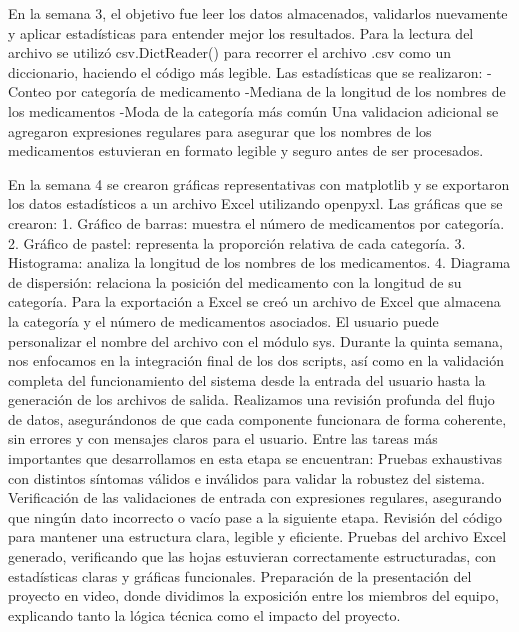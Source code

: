 \documentclass[11pt,letterpaper]{article}
\begin{document}
En la semana 3, el objetivo fue leer los datos almacenados, validarlos nuevamente y aplicar estadísticas para entender mejor los resultados. Para la lectura del archivo se utilizó csv.DictReader() para recorrer el archivo .csv como un diccionario, haciendo el código más legible. 
Las estadísticas que se realizaron:
-Conteo por categoría de medicamento
-Mediana de la longitud de los nombres de los medicamentos
-Moda de la categoría más común
Una validacion adicional se agregaron expresiones regulares para asegurar que los nombres de los medicamentos estuvieran en formato legible y seguro antes de ser procesados.

En la semana 4 se crearon gráficas representativas con matplotlib y se exportaron los datos estadísticos a un archivo Excel utilizando openpyxl.
Las gráficas que se crearon:
1. Gráfico de barras: muestra el número de medicamentos por categoría.
2. Gráfico de pastel: representa la proporción relativa de cada categoría.
3. Histograma: analiza la longitud de los nombres de los medicamentos.
4. Diagrama de dispersión: relaciona la posición del medicamento con la longitud de su categoría.
Para la exportación a Excel se creó un archivo de Excel que almacena la categoría y el número de medicamentos asociados. El usuario puede personalizar el nombre del archivo con el módulo sys.
Durante la quinta semana, nos enfocamos en la integración final de los dos scripts, así como en la validación completa del funcionamiento del sistema desde la entrada del usuario hasta la generación de los archivos de salida. Realizamos una revisión profunda del flujo de datos, asegurándonos de que cada componente funcionara de forma coherente, sin errores y con mensajes claros para el usuario.
Entre las tareas más importantes que desarrollamos en esta etapa se encuentran:
Pruebas exhaustivas con distintos síntomas válidos e inválidos para validar la robustez del sistema.
Verificación de las validaciones de entrada con expresiones regulares, asegurando que ningún dato incorrecto o vacío pase a la siguiente etapa.
Revisión del código para mantener una estructura clara, legible y eficiente.
Pruebas del archivo Excel generado, verificando que las hojas estuvieran correctamente estructuradas, con estadísticas claras y gráficas funcionales.
Preparación de la presentación del proyecto en video, donde dividimos la exposición entre los miembros del equipo, explicando tanto la lógica técnica como el impacto del proyecto.
\end{document}
